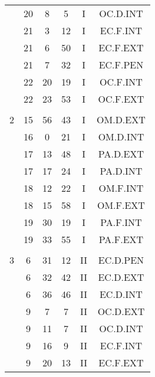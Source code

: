\documentclass[12pt, a4paper]{article}
\begin{document}
\begin{multicols}{3}
{\begin{tabular}{c c c c c c}
	 	 	 	 & 20 & 8 & 5 & I & OC.D.INT\\%
	 	 	 	 & 21 & 3 & 12 & I & EC.F.INT\\%
	 	 	 	 & 21 & 6 & 50 & I & EC.F.EXT\\%
	 	 	 	 & 21 & 7 & 32 & I & EC.F.PEN\\%
	 	 	 	 & 22 & 20 & 19 & I & OC.F.INT\\%
	 	 	 	 & 22 & 23 & 53 & I & OC.F.EXT\\%
	 	 	 	 & & & & & \\%
	 	 	 	2 & 15 & 56 & 43 & I & OM.D.EXT\\%
	 	 	 	 & 16 & 0 & 21 & I & OM.D.INT\\%
	 	 	 	 & 17 & 13 & 48 & I & PA.D.EXT\\%
	 	 	 	 & 17 & 17 & 24 & I & PA.D.INT\\%
	 	 	 	 & 18 & 12 & 22 & I & OM.F.INT\\%
	 	 	 	 & 18 & 15 & 58 & I & OM.F.EXT\\%
	 	 	 	 & 19 & 30 & 19 & I & PA.F.INT\\%
	 	 	 	 & 19 & 33 & 55 & I & PA.F.EXT\\%
	 	 	 	 & & & & & \\%
	 	 	 	3 & 6 & 31 & 12 & II & EC.D.PEN\\%
	 	 	 	 & 6 & 32 & 42 & II & EC.D.EXT\\%
	 	 	 	 & 6 & 36 & 46 & II & EC.D.INT\\%
	 	 	 	 & 9 & 7 & 7 & II & OC.D.EXT\\%
	 	 	 	 & 9 & 11 & 7 & II & OC.D.INT\\%
	 	 	 	 & 9 & 16 & 9 & II & EC.F.INT\\%
	 	 	 	 & 9 & 20 & 13 & II & EC.F.EXT\\%

\end{tabular}}
\end{multicols}
\end{document}
